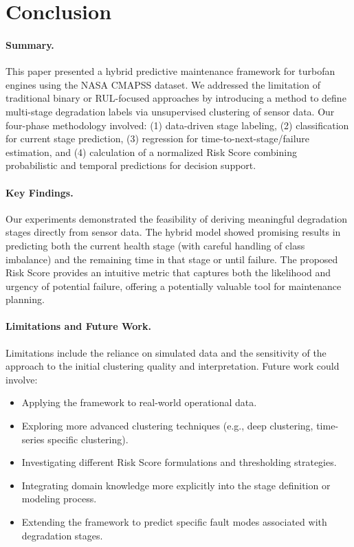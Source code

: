 \section{Conclusion}
\label{sec:conclusion}

\paragraph{Summary.}
This paper presented a hybrid predictive maintenance framework for turbofan engines using the NASA CMAPSS dataset. We addressed the limitation of traditional binary or RUL-focused approaches by introducing a method to define multi-stage degradation labels via unsupervised clustering of sensor data. Our four-phase methodology involved: (1) data-driven stage labeling, (2) classification for current stage prediction, (3) regression for time-to-next-stage/failure estimation, and (4) calculation of a normalized Risk Score combining probabilistic and temporal predictions for decision support.

\paragraph{Key Findings.}
Our experiments demonstrated the feasibility of deriving meaningful degradation stages directly from sensor data. The hybrid model showed promising results in predicting both the current health stage (with careful handling of class imbalance) and the remaining time in that stage or until failure. The proposed Risk Score provides an intuitive metric that captures both the likelihood and urgency of potential failure, offering a potentially valuable tool for maintenance planning.

\paragraph{Limitations and Future Work.}
Limitations include the reliance on simulated data and the sensitivity of the approach to the initial clustering quality and interpretation. Future work could involve:
\begin{itemize}
	\item Applying the framework to real-world operational data.
	\item Exploring more advanced clustering techniques (e.g., deep clustering, time-series specific clustering).
	\item Investigating different Risk Score formulations and thresholding strategies.
	\item Integrating domain knowledge more explicitly into the stage definition or modeling process.
	\item Extending the framework to predict specific fault modes associated with degradation stages.
\end{itemize}

